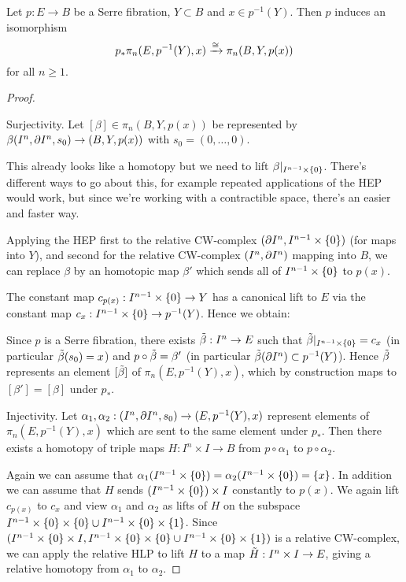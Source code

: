 \begin{proposition}
Let $p:E\to B$ be a Serre fibration, $Y\subset B$ and $x\in p^{-1}(Y)$. Then $p$ induces an isomorphism
\[p_*\pi_n(E,p^{-1}(Y),x)\xrightarrow{\cong}\pi_n(B,Y,p(x))\]
for all $n\geq1$.
\end{proposition}

\begin{proof}\ 

Surjectivity. Let $[\beta]\in\pi_n(B,Y,p(x))$ be represented by $\beta(I^n,\partial I^n,s_0)\to(B,Y,p(x))$ with $s_0=(0,\dots,0)$.


This already looks like a homotopy but we need to lift $\beta|_{I^{n-1}\times\{0\}}$. There's different ways to go about this, for example repeated applications of the HEP would work, but since we're working with a contractible space, there's an easier and faster way.

Applying the HEP first to the relative CW-complex $(\partial I^n,I^{n-1}\times\{0\})$ (for maps into $Y$), and second for the relative CW-complex $(I^n,\partial I^n)$ mapping into $B$, we can replace $\beta$ by an homotopic map $\beta'$ which sends all of $I^{n-1}\times\{0\}$ to $p(x)$.

The constant map $c_{p(x)}:I^{n-1}\times\{0\}\to Y$ has a canonical lift to $E$ via the constant map $c_x:I^{n-1}\times\{0\}\to p^{-1}(Y)$. Hence we obtain:
\begin{center}
\end{center}
Since $p$ is a Serre fibration, there exists $\tilde\beta:I^n\to E$ such that $\tilde\beta|_{I^{n-1}\times\{0\}}=c_x$ (in particular $\tilde\beta(s_0)=x$) and $p\circ\tilde\beta=\beta'$ (in particular $\tilde\beta(\partial I^n)\subset p^{-1}(Y)$). Hence $\tilde\beta$ represents an element $[\tilde\beta]$ of $\pi_n(E,p^{-1}(Y),x)$, which by construction maps to $[\beta']=[\beta]$ under $p_*$.

Injectivity. Let $\alpha_1,\alpha_2:(I^n,\partial I^n,s_0)\to(E,p^{-1}(Y),x)$ represent elements of $\pi_n(E,p^{-1}(Y),x)$ which are sent to the same element under $p_*$. Then there exists a homotopy of triple maps $H:I^n\times I\to B$ from $p\circ\alpha_1$ to $p\circ\alpha_2$.\alvaropls{}

Again we can assume that $\alpha_1(I^{n-1}\times\{0\})=\alpha_2(I^{n-1}\times\{0\})=\{x\}$. In addition we can assume that $H$ sends $(I^{n-1}\times\{0\})\times I$ constantly to $p(x)$. We again lift $c_{p(x)}$ to $c_x$ and view $\alpha_1$ and $\alpha_2$ as lifts of $H$ on the subspace $I^{n-1}\times\{0\}\times\{0\}\cup I^{n-1}\times\{0\}\times\{1\}$. Since $(I^{n-1}\times\{0\}\times I,I^{n-1}\times\{0\}\times\{0\}\cup I^{n-1}\times\{0\}\times\{1\})$ is a relative CW-complex, we can apply the relative HLP to lift $H$ to a map $\tilde H:I^n\times I\to E$, giving a relative homotopy from $\alpha_1$ to $\alpha_2$.
\end{proof}

